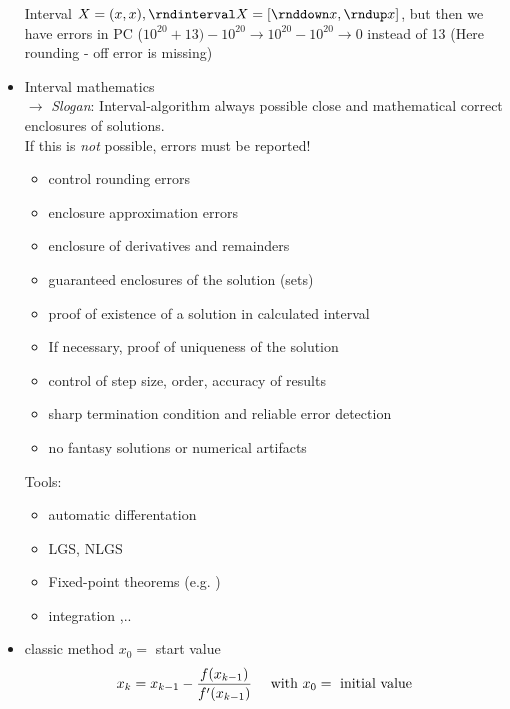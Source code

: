 \begin{itemize}
\begin{center}
	\end{center}
	Interval $X=(x,x) , \rndinterval X=[\rnddown x, \rndup x]$, but then we have errors in PC ($10^{20}+13)-10^{20} \to 10^{20}-10^{20} \to 0$ instead of 13 (Here rounding - off error is missing)
	\item Interval mathematics\\
	$\to$ \emph{Slogan}: Interval-algorithm always possible close and mathematical correct enclosures of solutions.\\
	If this is \emph{not} possible, errors must be reported!
	\begin{itemize}
		\item control rounding errors
		\item enclosure approximation errors
		\item enclosure of derivatives and remainders
		\item guaranteed enclosures of the solution (sets) 
		\item proof of existence of a solution in calculated interval
		\item If necessary, proof of  uniqueness of the solution
		\item control of step size, order, accuracy of results
		\item sharp termination condition and reliable error detection
		\item no fantasy solutions or numerical artifacts
	\end{itemize}
	Tools:
	\begin{itemize}
		\item automatic differentation
		\item LGS, NLGS
		\item Fixed-point theorems (e.g. )
		\item integration ,..
	\end{itemize}
	\item classic  method
	\newline $x_0=$ start value \smallskip
	\newline
	\begin{align*}
		x_k=x_{k-1}-\frac{f(x_{k-1})}{f'(x_{k-1})} \quad \text{ with } x_0 = \text{ initial value} 
	\end{align*}

\end{itemize}
